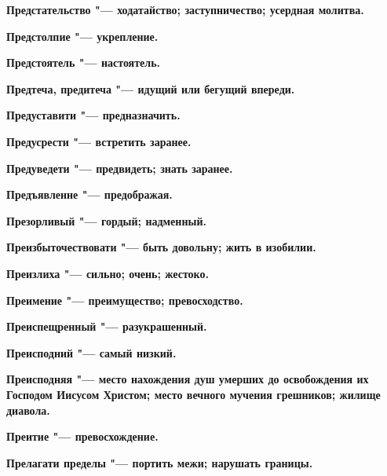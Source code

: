 \begin{multicols}{2}
\bfseries Предстательство\normalfont{} "--- ходатайство; заступничество; усердная молитва. 




\bfseries Предстолпие\normalfont{} "--- укрепление. 




\bfseries Предстоятель\normalfont{} "--- настоятель. 




\bfseries Предтеча, предитеча\normalfont{} "--- идущий или бегущий впереди. 




\bfseries Предуставити\normalfont{} "--- предназначить. 




\bfseries Предусрести\normalfont{} "--- встретить заранее. 




\bfseries Предуведети\normalfont{} "--- предвидеть; знать заранее. 




\bfseries Предъявленне\normalfont{} "--- предображая. 




\bfseries Презорливый\normalfont{} "--- гордый; надменный. 




\bfseries Преизбыточествовати\normalfont{} "--- быть довольну; жить в изобилии. 




\bfseries Преизлиха\normalfont{} "--- сильно; очень; жестоко. 




\bfseries Преимение\normalfont{} "--- преимущество; превосходство. 




\bfseries Преиспещренный\normalfont{} "--- разукрашенный. 




\bfseries Преисподний\normalfont{} "--- самый низкий. 




\bfseries Преисподняя\normalfont{} "--- место нахождения душ умерших до освобождения их Господом Иисусом Христом; место вечного мучения грешников; жилище диавола. 




\bfseries Преитие\normalfont{} "--- превосхождение. 




\bfseries Прелагати пределы\normalfont{} "--- портить межи; нарушать границы. 





\end{multicols}
